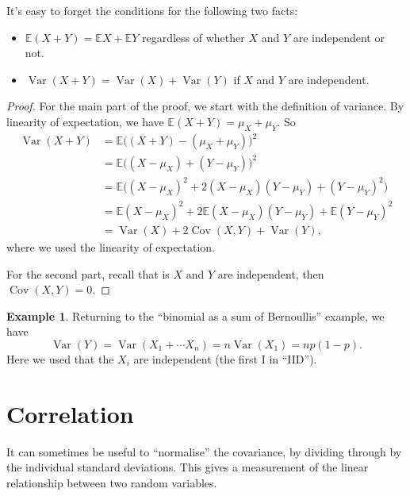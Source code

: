 \documentclass[
  a4paper,
]{book}
\providecommand{\tightlist}{%
  \setlength{\itemsep}{0pt}\setlength{\parskip}{0pt}}
\theoremstyle{definition}
\theoremstyle{definition}
\newtheorem{example}{Example}[chapter]
\theoremstyle{definition}
\theoremstyle{definition}
\theoremstyle{remark}
\begin{document}
It's easy to forget the conditions for the following two facts:

\begin{itemize}
\tightlist
\item
  \(\mathbb E(X + Y) = \mathbb EX + \mathbb EY\) regardless of whether \(X\) and \(Y\) are independent or not.
\item
  \(\operatorname{Var}(X+Y) = \operatorname{Var}(X) + \operatorname{Var}(Y)\) if \(X\) and \(Y\) are independent.
\end{itemize}

\begin{proof}
For the main part of the proof, we start with the definition of variance. By linearity of expectation, we have \(\mathbb E(X + Y) = \mu_X + \mu_Y\). So
\begin{align*}
\operatorname{Var}(X + Y) &= \mathbb E\big((X + Y) - (\mu_X + \mu_Y)\big)^2 \\
  &= \mathbb E \big((X - \mu_X) + (Y - \mu_Y) \big)^2 \\
  &= \mathbb E \big( (X - \mu_X)^2 + 2(X - \mu_X)(Y - \mu_Y) + (Y - \mu_Y)^2\big) \\
  &= \mathbb E(X - \mu_X)^2 + 2 \mathbb E(X - \mu_X)(Y - \mu_Y) + \mathbb E (Y - \mu_Y)^2 \\
  &= \operatorname{Var}(X) + 2\operatorname{Cov}(X,Y) + \operatorname{Var}(Y) ,
\end{align*}
where we used the linearity of expectation.

For the second part, recall that is \(X\) and \(Y\) are independent, then \(\operatorname{Cov}(X,Y) = 0\).
\end{proof}

\begin{example}
Returning to the ``binomial as a sum of Bernoullis'' example, we have
\[ \operatorname{Var}(Y) = \operatorname{Var}(X_1 + \cdots X_n) = n\operatorname{Var}(X_1) = np(1-p) . \]
Here we used that the \(X_i\) are independent (the first I in ``IID'').
\end{example}

\hypertarget{correlation}{%
\section{Correlation}\label{correlation}}

It can sometimes be useful to ``normalise'' the covariance, by dividing through by the individual standard deviations. This gives a measurement of the linear relationship between two random variables.
\end{document}
